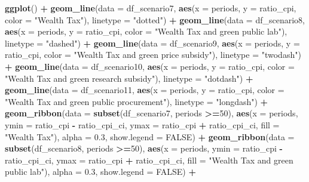 \documentclass[
]{article}
\newenvironment{Shaded}{\begin{snugshade}}{\end{snugshade}}
\newcommand{\AttributeTok}[1]{\textcolor[rgb]{0.13,0.29,0.53}{#1}}
\newcommand{\ConstantTok}[1]{\textcolor[rgb]{0.56,0.35,0.01}{#1}}
\newcommand{\DecValTok}[1]{\textcolor[rgb]{0.00,0.00,0.81}{#1}}
\newcommand{\FloatTok}[1]{\textcolor[rgb]{0.00,0.00,0.81}{#1}}
\newcommand{\FunctionTok}[1]{\textcolor[rgb]{0.13,0.29,0.53}{\textbf{#1}}}
\newcommand{\NormalTok}[1]{#1}
\newcommand{\SpecialCharTok}[1]{\textcolor[rgb]{0.81,0.36,0.00}{\textbf{#1}}}
\newcommand{\StringTok}[1]{\textcolor[rgb]{0.31,0.60,0.02}{#1}}
\begin{document}
\begin{Shaded}
\begin{Highlighting}[]
\FunctionTok{ggplot}\NormalTok{() }\SpecialCharTok{+}
  \FunctionTok{geom\_line}\NormalTok{(}\AttributeTok{data =}\NormalTok{ df\_scenario7, }\FunctionTok{aes}\NormalTok{(}\AttributeTok{x =}\NormalTok{ periods, }\AttributeTok{y =}\NormalTok{ ratio\_cpi, }\AttributeTok{color =} \StringTok{"Wealth Tax"}\NormalTok{), }\AttributeTok{linetype =} \StringTok{"dotted"}\NormalTok{) }\SpecialCharTok{+}
  \FunctionTok{geom\_line}\NormalTok{(}\AttributeTok{data =}\NormalTok{ df\_scenario8, }\FunctionTok{aes}\NormalTok{(}\AttributeTok{x =}\NormalTok{ periods, }\AttributeTok{y =}\NormalTok{ ratio\_cpi, }\AttributeTok{color =} \StringTok{"Wealth Tax and green public lab"}\NormalTok{), }\AttributeTok{linetype =} \StringTok{"dashed"}\NormalTok{) }\SpecialCharTok{+}
  \FunctionTok{geom\_line}\NormalTok{(}\AttributeTok{data =}\NormalTok{ df\_scenario9, }\FunctionTok{aes}\NormalTok{(}\AttributeTok{x =}\NormalTok{ periods, }\AttributeTok{y =}\NormalTok{ ratio\_cpi, }\AttributeTok{color =} \StringTok{"Wealth Tax and green price subsidy"}\NormalTok{), }\AttributeTok{linetype =} \StringTok{"twodash"}\NormalTok{) }\SpecialCharTok{+}
  \FunctionTok{geom\_line}\NormalTok{(}\AttributeTok{data =}\NormalTok{ df\_scenario10, }\FunctionTok{aes}\NormalTok{(}\AttributeTok{x =}\NormalTok{ periods, }\AttributeTok{y =}\NormalTok{ ratio\_cpi, }\AttributeTok{color =} \StringTok{"Wealth Tax and green research subsidy"}\NormalTok{), }\AttributeTok{linetype =} \StringTok{"dotdash"}\NormalTok{) }\SpecialCharTok{+}
  \FunctionTok{geom\_line}\NormalTok{(}\AttributeTok{data =}\NormalTok{ df\_scenario11, }\FunctionTok{aes}\NormalTok{(}\AttributeTok{x =}\NormalTok{ periods, }\AttributeTok{y =}\NormalTok{ ratio\_cpi, }\AttributeTok{color =} \StringTok{"Wealth Tax and green public procurement"}\NormalTok{), }\AttributeTok{linetype =} \StringTok{"longdash"}\NormalTok{) }\SpecialCharTok{+}
  \FunctionTok{geom\_ribbon}\NormalTok{(}\AttributeTok{data =} \FunctionTok{subset}\NormalTok{(df\_scenario7, periods }\SpecialCharTok{\textgreater{}=}\DecValTok{50}\NormalTok{), }\FunctionTok{aes}\NormalTok{(}\AttributeTok{x =}\NormalTok{ periods, }\AttributeTok{ymin =}\NormalTok{ ratio\_cpi }\SpecialCharTok{{-}}\NormalTok{ ratio\_cpi\_ci, }\AttributeTok{ymax =}\NormalTok{ ratio\_cpi }\SpecialCharTok{+}\NormalTok{ ratio\_cpi\_ci, }\AttributeTok{fill =} \StringTok{"Wealth Tax"}\NormalTok{), }\AttributeTok{alpha =} \FloatTok{0.3}\NormalTok{, }\AttributeTok{show.legend =} \ConstantTok{FALSE}\NormalTok{) }\SpecialCharTok{+}
  \FunctionTok{geom\_ribbon}\NormalTok{(}\AttributeTok{data =} \FunctionTok{subset}\NormalTok{(df\_scenario8, periods }\SpecialCharTok{\textgreater{}=}\DecValTok{50}\NormalTok{), }\FunctionTok{aes}\NormalTok{(}\AttributeTok{x =}\NormalTok{ periods, }\AttributeTok{ymin =}\NormalTok{ ratio\_cpi }\SpecialCharTok{{-}}\NormalTok{ ratio\_cpi\_ci, }\AttributeTok{ymax =}\NormalTok{ ratio\_cpi }\SpecialCharTok{+}\NormalTok{ ratio\_cpi\_ci, }\AttributeTok{fill =} \StringTok{"Wealth Tax and green public lab"}\NormalTok{), }\AttributeTok{alpha =} \FloatTok{0.3}\NormalTok{, }\AttributeTok{show.legend =} \ConstantTok{FALSE}\NormalTok{) }\SpecialCharTok{+}

\end{Highlighting}
\end{Shaded}
\end{document}
